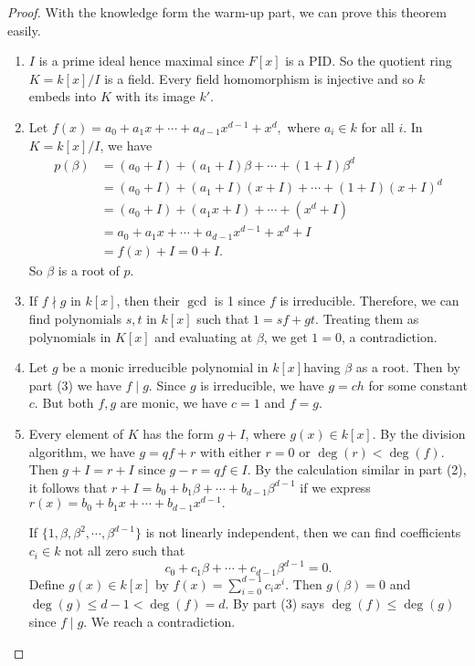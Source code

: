 \documentclass[12pt]{report}
\theoremstyle{definition}
\def\bb{\beta}
\begin{document}
\begin{proof}
    With the knowledge form the warm-up part, we can prove this theorem easily.
    \begin{enumerate}
        \item  $I$ is a prime ideal hence maximal since $F[x]$ is a PID. So the quotient ring $K=k[x]/I$ is a field. Every field homomorphism is injective and so $k$ embeds into $K$ with its image $k'$.
        \item Let $f(x)= a_0+a_1x+\cdots+a_{d-1}x^{d-1}+x^d,$ where $a_i\in k$ for all $i$. In $K=k[x]/I$, we have \begin{align*}
            p(\bb) &= (a_0+I)+(a_1+I)\bb+\cdots+(1+I)\bb^d \\
            &= (a_0+I)+(a_1+I)(x+I)+\cdots+(1+I)(x+I)^d \\
            &= (a_0+I)+(a_1x+I)+\cdots+(x^d +I)\\
            &= a_0+a_1x+\cdots+a_{d-1}x^{d-1}+x^d +I \\
            &= f(x)+I = 0+I.
        \end{align*} So $\beta$ is a root of $p$.
        \item If $f\nmid g$ in $k[x]$, then their $\gcd$ is 1 since $f$ is irreducible. Therefore, we can find polynomials $s,t$ in $k[x]$ such that $1=sf+gt$. Treating them as polynomials in $K[x]$ and evaluating at $\beta$, we get $1=0$, a contradiction.
        \item Let $g$ be a monic irreducible polynomial in $k[x]$having $\bb$ as a root. Then by part (3) we have $f\mid g$. Since $g$ is irreducible, we have $g=ch$ for some constant $c$. But both $f,g$ are monic, we have $c=1$ and $f=g$.
        \item Every element of $K$ has the form $g+I$, where $g(x)\in k[x]$. By the division algorithm, we have $g=qf+r$ with either $r=0$ or $\deg(r)<\deg(f)$. Then $g+I=r+I$ since $g-r=qf\in I$. By the calculation similar in part (2), it follows that $r+I = b_0+b_1\bb+\cdots+ b_{d-1} \bb^{d-1}$ if we express $r(x)= b_0+b_1 x+\cdots+b_{d-1}x^{d-1}.$   
        
        If $\{1,\beta,\beta^2,\cdots,\beta^{d-1}\}$ is not linearly independent, then we can find coefficients $c_i\in k$ not all zero such that $$c_0+c_1\bb+\cdots+c_{d-1}\bb^{d-1}=0.$$ Define $g(x)\in k[x]$ by $f(x)=\sum_{i=0}^{d-1}c_ix^i$. Then $g(\bb)=0$ and $\deg(g)\leq d-1 <\deg(f)=d$. By part (3) says $\deg(f)\leq \deg(g)$ since $f\mid g$. We reach a contradiction.
    \end{enumerate}
\end{proof}
\end{document}
